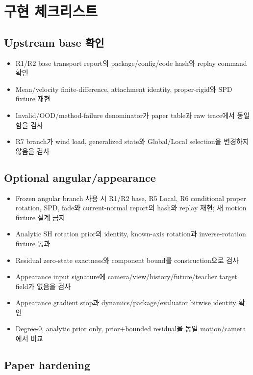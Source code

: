 \documentclass[10pt]{article}
\begin{document}
\section{구현 체크리스트}
\label{sec:r7-chapter-4}

\subsection{Upstream base 확인}

\begin{itemize}
  \item[$\square$] R1/R2 base transport report의 package/config/code hash와 replay command 확인
  \item[$\square$] Mean/velocity finite-difference, attachment identity, proper-rigid와 SPD fixture 재현
  \item[$\square$] Invalid/OOD/method-failure denominator가 paper table과 raw trace에서 동일함을 검사
  \item[$\square$] R7 branch가 wind load, generalized state와 Global/Local selection을 변경하지 않음을 검사
\end{itemize}

\subsection{Optional angular/appearance}

\begin{itemize}
  \item[$\square$] Frozen angular branch 사용 시 R1/R2 base, R5 Local, R6 conditional
  proper rotation, SPD, fade와 current-normal report의 hash와 replay 재현; 새 motion fixture 설계 금지
  \item[$\square$] Analytic SH rotation prior의 identity, known-axis rotation과 inverse-rotation fixture 통과
  \item[$\square$] Residual zero-state exactness와 component bound를 construction으로 검사
  \item[$\square$] Appearance input signature에 camera/view/history/future/teacher target field가 없음을 검사
  \item[$\square$] Appearance gradient stop과 dynamics/package/evaluator bitwise identity 확인
  \item[$\square$] Degree-0, analytic prior only, prior+bounded residual을 동일 motion/camera에서 비교
\end{itemize}

\subsection{Paper hardening}
\end{document}
